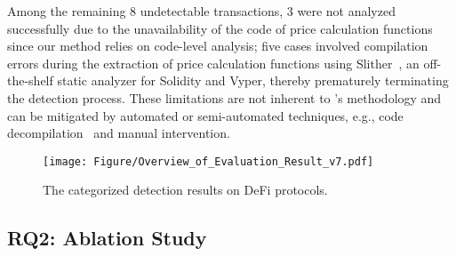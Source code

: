 Among the remaining 8 undetectable transactions, 
3 were not analyzed successfully due to the unavailability of the code of price calculation functions since our method relies on code-level analysis; 
five cases involved compilation errors during the extraction of price calculation functions using Slither~\cite{slither}, an off-the-shelf static analyzer for Solidity and Vyper, thereby prematurely terminating the detection process. 
These limitations are not inherent to \tool's methodology and can be mitigated by automated or semi-automated techniques, e.g., code decompilation~\cite{grech2019gigahorse,grech2022elipmoc,suiche2017porosity} and manual intervention.


\begin{figure}[t]
    \centering
    \small
    \texttt{[image: Figure/Overview\_of\_Evaluation\_Result\_v7.pdf]}
    \vspace{-1ex}
    \caption{The categorized detection results on DeFi protocols.}
    \label{fig:price_model_proportion}
\end{figure}


\subsection{RQ2: Ablation Study}
\label{sec:RQ2}

